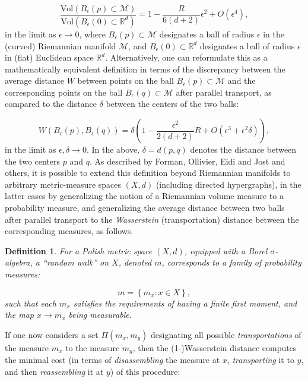 \documentclass{article}
\newtheorem{definition}{Definition}
\begin{document}
\begin{equation}
\frac{\mathrm{Vol} \left( B_{\epsilon} \left( p \right) \subset \mathcal{M} \right)}{\mathrm{Vol} \left( B_{\epsilon} \left( 0 \right) \subset \mathbb{R}^d \right)} = 1 - \frac{R}{6 \left( d + 2 \right)} \epsilon^2 + O \left( \epsilon^4 \right),
\end{equation}
in the limit as ${\epsilon \to 0}$, where ${B_{\epsilon} \left( p \right) \subset \mathcal{M}}$ designates a ball of radius ${\epsilon}$ in the (curved) Riemannian manifold ${\mathcal{M}}$, and ${B_{\epsilon} \left( 0 \right) \subset \mathbb{R}^d}$ designates a ball of radius ${\epsilon}$ in (flat) Euclidean space ${\mathbb{R}^d}$. Alternatively, one can reformulate this as a mathematically equivalent definition in terms of the discrepancy between the average distance $W$ between points on the ball ${B_{\epsilon} \left( p \right) \subset \mathcal{M}}$ and the corresponding points on the ball ${B_{\epsilon} \left( q \right) \subset \mathcal{M}}$ after parallel transport, as compared to the distance ${\delta}$ between the centers of the two balls:

\begin{equation}
W \left( B_{\epsilon} \left( p \right), B_{\epsilon} \left( q \right) \right) = \delta \left( 1 - \frac{\epsilon^2}{2 \left( d + 2 \right)} R + O \left( \epsilon^3 + \epsilon^2 \delta \right) \right),
\end{equation}
in the limit as ${\epsilon, \delta \to 0}$. In the above, ${\delta = d \left( p, q \right)}$ denotes the distance between the two centers $p$ and $q$. As described by Forman\cite{forman}, Ollivier\cite{ollivier}\cite{ollivier2}\cite{ollivier3}, Eidi and Jost\cite{eidi} and others, it is possible to extend this definition beyond Riemannian manifolds to arbitrary metric-measure spaces ${\left( X, d \right)}$ (including directed hypergraphs), in the latter cases by generalizing the notion of a Riemannian volume measure to a probability measure, and generalizing the average distance between two balls after parallel transport to the \textit{Wasserstein} (transportation) distance between the corresponding measures, as follows.

\begin{definition}
For a Polish metric space ${\left( X, d \right)}$, equipped with a Borel ${\sigma}$-algebra, a ``random walk'' on $X$, denoted $m$, corresponds to a family of probability measures:

\begin{equation}
m = \left\lbrace m_x : x \in X \right\rbrace,
\end{equation}
such that each ${m_x}$ satisfies the requirements of having a finite first moment, and the map ${x \to m_x}$ being measurable.
\end{definition}
If one now considers a set ${\Pi \left( m_x, m_y \right)}$ designating all possible \textit{transportations} of the measure ${m_x}$ to the measure ${m_y}$, then the (1-)Wasserstein distance computes the minimal cost (in terms of \textit{disassembling} the measure at $x$, \textit{transporting} it to $y$, and then \textit{reassembling} it at $y$) of this procedure:
\end{document}
